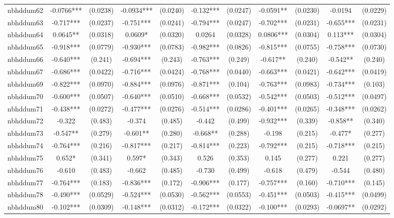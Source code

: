 \documentclass[]{article}
\begin{document}
\begin{tabular}{lcccccccccc}
nbhddum62 & -0.0766*** & (0.0238) & -0.0934*** & (0.0240) & -0.132*** & (0.0247) & -0.0591** & (0.0230) & -0.0194 & (0.0229) \\
nbhddum63 & -0.717*** & (0.0237) & -0.751*** & (0.0241) & -0.794*** & (0.0247) & -0.702*** & (0.0231) & -0.655*** & (0.0231) \\
nbhddum64 & 0.0645** & (0.0318) & 0.0609* & (0.0320) & 0.0264 & (0.0328) & 0.0806*** & (0.0304) & 0.113*** & (0.0304) \\
nbhddum65 & -0.918*** & (0.0779) & -0.930*** & (0.0783) & -0.982*** & (0.0826) & -0.815*** & (0.0755) & -0.758*** & (0.0730) \\
nbhddum66 & -0.640*** & (0.241) & -0.694*** & (0.243) & -0.763*** & (0.249) & -0.617** & (0.240) & -0.542** & (0.240) \\
nbhddum67 & -0.686*** & (0.0422) & -0.716*** & (0.0424) & -0.768*** & (0.0440) & -0.663*** & (0.0421) & -0.642*** & (0.0419) \\
nbhddum69 & -0.822*** & (0.0970) & -0.884*** & (0.0976) & -0.871*** & (0.104) & -0.763*** & (0.0983) & -0.734*** & (0.103) \\
nbhddum70 & -0.600*** & (0.0507) & -0.640*** & (0.0510) & -0.668*** & (0.0532) & -0.542*** & (0.0503) & -0.512*** & (0.0497) \\
nbhddum71 & -0.438*** & (0.0272) & -0.477*** & (0.0276) & -0.514*** & (0.0286) & -0.401*** & (0.0265) & -0.348*** & (0.0262) \\
nbhddum72 & -0.322 & (0.483) & -0.374 & (0.485) & -0.442 & (0.499) & -0.932*** & (0.339) & -0.858** & (0.340) \\
nbhddum73 & -0.547** & (0.279) & -0.601** & (0.280) & -0.668** & (0.288) & -0.198 & (0.215) & -0.477* & (0.277) \\
nbhddum74 & -0.764*** & (0.216) & -0.817*** & (0.217) & -0.814*** & (0.223) & -0.792*** & (0.215) & -0.718*** & (0.215) \\
nbhddum75 & 0.652* & (0.341) & 0.597* & (0.343) & 0.526 & (0.353) & 0.145 & (0.277) & 0.221 & (0.277) \\
nbhddum76 & -0.610 & (0.483) & -0.662 & (0.485) & -0.730 & (0.499) & -0.618 & (0.479) & -0.544 & (0.480) \\
nbhddum77 & -0.764*** & (0.183) & -0.836*** & (0.172) & -0.906*** & (0.177) & -0.757*** & (0.160) & -0.710*** & (0.145) \\
nbhddum78 & -0.490*** & (0.0529) & -0.524*** & (0.0530) & -0.562*** & (0.0553) & -0.451*** & (0.0503) & -0.415*** & (0.0499) \\
nbhddum80 & -0.102*** & (0.0309) & -0.148*** & (0.0312) & -0.172*** & (0.0322) & -0.100*** & (0.0293) & -0.0697** & (0.0292) \\

\end{tabular}
\end{document}
